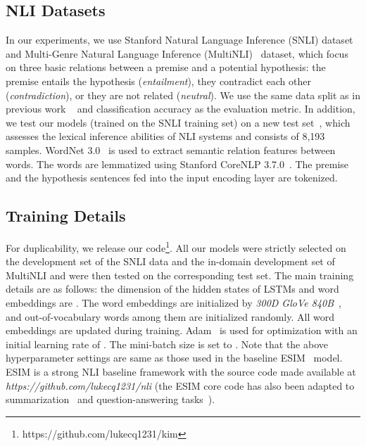 \documentclass[11pt,a4paper]{article}
\begin{document}
\subsection{NLI Datasets}
In our experiments, we use Stanford Natural Language Inference (SNLI) dataset~\citep{DBLP:conf/emnlp/BowmanAPM15} and Multi-Genre Natural Language Inference (MultiNLI)~\citep{DBLP:journals/corr/WilliamsNB17} dataset, which focus on three basic relations between a premise and a potential hypothesis: the premise entails the hypothesis (\textit{entailment}), they contradict each other (\textit{contradiction}), or they are not related (\textit{neutral}). 
We use the same data split as in previous work ~\citep{DBLP:conf/emnlp/BowmanAPM15,DBLP:journals/corr/WilliamsNB17} and classification accuracy as the evaluation metric. 
In addition, we test our models (trained on the SNLI training set) on a new test set~\citep{glockner_acl18}, which assesses the lexical inference abilities of NLI systems and consists of 8,193 samples.
WordNet 3.0~\citep{DBLP:journals/cacm/Miller95} is used to extract semantic relation features between words. The words are lemmatized using Stanford CoreNLP 3.7.0~\citep{DBLP:conf/acl/ManningSBFBM14}. The premise and the hypothesis sentences fed into the input encoding layer are tokenized.

\subsection{Training Details}
For duplicability, we release our code\footnote{https://github.com/lukecq1231/kim}. All our models were strictly selected on the development set of the SNLI data and the in-domain development set of MultiNLI and were then tested on the corresponding test set. The main training details are as follows: the dimension of the hidden states of LSTMs and word embeddings are . The word embeddings are initialized by \textit{300D GloVe 840B}~\citep{DBLP:conf/emnlp/PenningtonSM14}, and out-of-vocabulary words among them are initialized randomly. All word embeddings are updated during training. Adam~\citep{DBLP:journals/corr/KingmaB14} is used for optimization with an initial learning rate of . The mini-batch size is set to . Note that the above hyperparameter settings are same as those used in the baseline ESIM~\citep{DBLP:conf/acl/ChenZLWJI17} model. ESIM is a strong NLI baseline framework with the source code made available at \textit{https://github.com/lukecq1231/nli} (the ESIM core code has also been adapted to summarization~\citep{DBLP:conf/ijcai/ChenZLWJ16} and question-answering tasks~\citep{Zhang:qa:2017}). 
\end{document}
